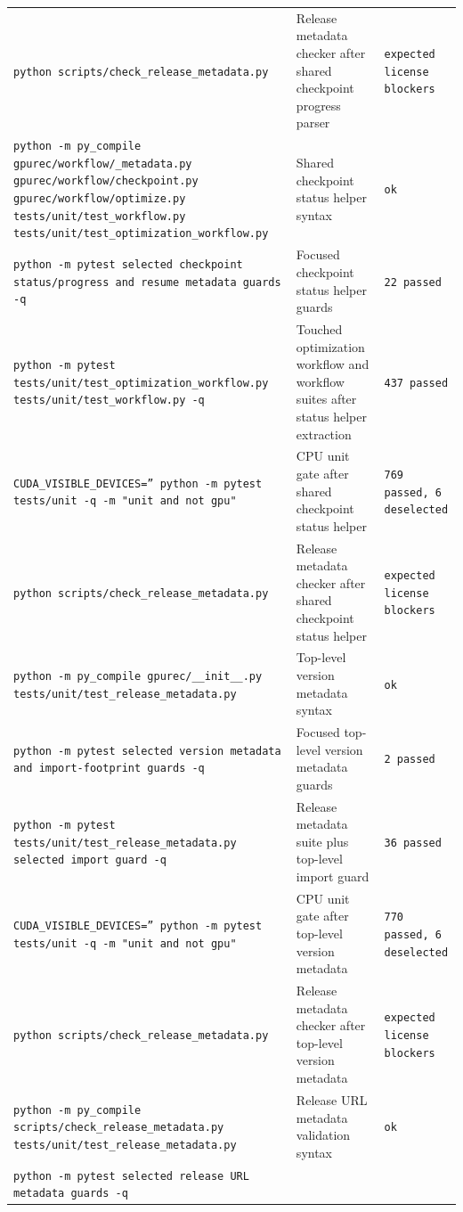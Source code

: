 \documentclass[11pt]{article}
\begin{document}
\begin{center}
\begin{tabular}{lll}
\texttt{python scripts/check\_release\_metadata.py} &
Release metadata checker after shared checkpoint progress parser &
\texttt{expected license blockers} \\
\texttt{python -m py\_compile gpurec/workflow/\_metadata.py gpurec/workflow/checkpoint.py gpurec/workflow/optimize.py tests/unit/test\_workflow.py tests/unit/test\_optimization\_workflow.py} &
Shared checkpoint status helper syntax &
\texttt{ok} \\
\texttt{python -m pytest selected checkpoint status/progress and resume metadata guards -q} &
Focused checkpoint status helper guards &
\texttt{22 passed} \\
\texttt{python -m pytest tests/unit/test\_optimization\_workflow.py tests/unit/test\_workflow.py -q} &
Touched optimization workflow and workflow suites after status helper extraction &
\texttt{437 passed} \\
\texttt{CUDA\_VISIBLE\_DEVICES='' python -m pytest tests/unit -q -m "unit and not gpu"} &
CPU unit gate after shared checkpoint status helper &
\texttt{769 passed, 6 deselected} \\
\texttt{python scripts/check\_release\_metadata.py} &
Release metadata checker after shared checkpoint status helper &
\texttt{expected license blockers} \\
\texttt{python -m py\_compile gpurec/\_\_init\_\_.py tests/unit/test\_release\_metadata.py} &
Top-level version metadata syntax &
\texttt{ok} \\
\texttt{python -m pytest selected version metadata and import-footprint guards -q} &
Focused top-level version metadata guards &
\texttt{2 passed} \\
\texttt{python -m pytest tests/unit/test\_release\_metadata.py selected import guard -q} &
Release metadata suite plus top-level import guard &
\texttt{36 passed} \\
\texttt{CUDA\_VISIBLE\_DEVICES='' python -m pytest tests/unit -q -m "unit and not gpu"} &
CPU unit gate after top-level version metadata &
\texttt{770 passed, 6 deselected} \\
\texttt{python scripts/check\_release\_metadata.py} &
Release metadata checker after top-level version metadata &
\texttt{expected license blockers} \\
\texttt{python -m py\_compile scripts/check\_release\_metadata.py tests/unit/test\_release\_metadata.py} &
Release URL metadata validation syntax &
\texttt{ok} \\
\texttt{python -m pytest selected release URL metadata guards -q} &

\end{tabular}
\end{center}
\end{document}
